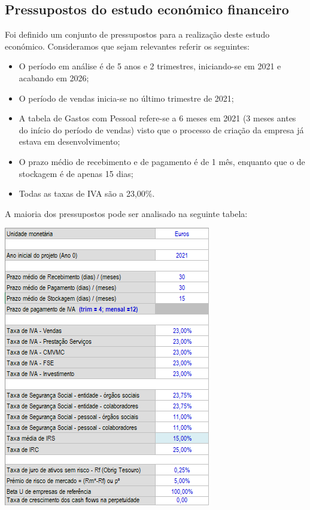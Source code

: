 \documentclass[a4paper]{article}
\begin{document}
\subsection{Pressupostos do estudo económico financeiro}
Foi definido um conjunto de pressupostos para a realização deste estudo económico. Consideramos que sejam relevantes referir os seguintes:
\begin{itemize}
    \item O período em análise é de 5 anos e 2 trimestres, iniciando-se em 2021 e acabando em 2026;
    \item O período de vendas inicia-se no último trimestre de 2021;
    \item A tabela de Gastos com Pessoal refere-se a 6 meses em 2021 (3 meses antes do início do período de vendas) visto que o processo de criação da empresa já estava em desenvolvimento;
    \item O prazo médio de recebimento e de pagamento é de 1 mês, enquanto que o de stockagem é de apenas 15 dias;
    \item Todas as taxas de IVA são a 23,00\%.
\end{itemize}
A maioria dos pressupostos pode ser analisado na seguinte tabela:
\begin{center}
    \includegraphics[scale=1.0]{images/pressupostos.png}
\end{center}
\end{document}
